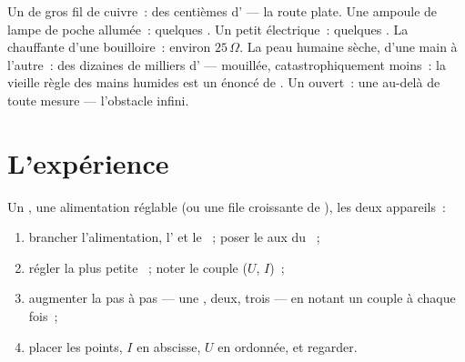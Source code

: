 \begin{example}\label{ex:g8:ohms-law:values}
Un  de gros fil de cuivre~: des centièmes d' --- la route
plate. Une ampoule de lampe de poche allumée~: quelques . Un petit
 électrique~: quelques . La  chauffante d'une
bouilloire~: environ $25\,\Omega$. La peau humaine sèche, d'une main à
l'autre~: des dizaines de milliers d' --- mouillée,
catastrophiquement moins~: la vieille règle des mains humides est un
énoncé de . Un  ouvert~: une 
au-delà de toute mesure --- l'obstacle infini.
\end{example}

\section{L'expérience}

\begin{method}\label{met:g8:ohms-law:portrait}
Un , une alimentation réglable (ou une file croissante de
), les deux appareils~:
\begin{enumerate}
  \item brancher l'alimentation, l' et le  ~; poser le  aux  du ~;
  \item régler la plus petite ~; noter le couple ($U$, $I$)~;
  \item augmenter la  pas à pas --- une , deux, trois ---
        en notant un couple à chaque fois~;
  \item placer les points, $I$ en abscisse, $U$ en ordonnée, et
        regarder.
\end{enumerate}
\end{method}

